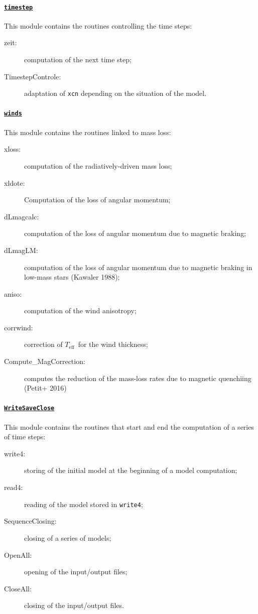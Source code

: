 \documentclass[11pt]{article}
\def\teff{\ensuremath{T_\text{eff}}}
\begin{document}
\paragraph{\underline{\texttt{timestep}}}
This module contains the routines controlling the time steps:

\begin{description}
 \item[zeit:] computation of the next time step;
 \item[TimestepControle:] adaptation of \texttt{xcn} depending on the situation of the model.
 \end{description}

\paragraph{\underline{\texttt{winds}}}
This module contains the routines linked to mass loss:

\begin{description}
 \item[xloss:] computation of the radiatively-driven mass loss;
 \item[xldote:] Computation of the loss of angular momentum;
 \item[dLmagcalc:] computation of the loss of angular momentum due to magnetic braking;
 \item[dLmagLM:] computation of the loss of angular momentum due to magnetic braking in low-mass stars (Kawaler 1988);
 \item[aniso:] computation of the wind anisotropy;
 \item[corrwind:] correction of \teff\ for the wind thickness;
 \item[Compute\_MagCorrection:] computes the reduction of the mass-loss rates due to magnetic quenchiing (Petit+ 2016)
 \end{description}

\paragraph{\underline{\texttt{WriteSaveClose}}}
This module contains the routines that start and end the computation of a series of time steps:

\begin{description}
 \item[write4:] storing of the initial model at the beginning of a model computation;
 \item[read4:] reading of the model stored in \texttt{write4};
 \item[SequenceClosing:] closing of a series of models;
 \item[OpenAll:] opening of the input/output files;
 \item[CloseAll:] closing of the input/output files.
 \end{description}

%
%
\end{document}
